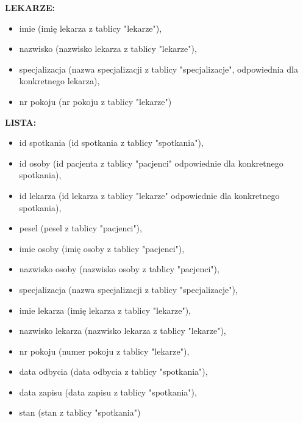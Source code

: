 \documentclass[a4paper]{article} \usepackage{polski} \usepackage[cp1250]{inputenc} \usepackage{url}
\begin{document}
\textbf{LEKARZE:}
\begin {itemize}
\item imie (imię lekarza z tablicy "lekarze"),
\item nazwisko (nazwisko lekarza z tablicy "lekarze"),
\item specjalizacja (nazwa specjalizacji z tablicy "specjalizacje", odpowiednia dla konkretnego lekarza),
\item  nr pokoju (nr pokoju z tablicy "lekarze")
\end {itemize}\newline

\textbf{LISTA:}
\begin {itemize}
\item id spotkania (id spotkania z tablicy "spotkania"),
\item id osoby (id pacjenta z tablicy "pacjenci" odpowiednie dla konkretnego spotkania),
\item id lekarza (id lekarza z tablicy "lekarze" odpowiednie dla konkretnego spotkania),
\item pesel (pesel z tablicy "pacjenci"),
\item imie osoby (imię osoby z tablicy "pacjenci"),
\item nazwisko osoby (nazwisko osoby z tablicy "pacjenci"),
\item specjalizacja (nazwa specjalizacji z tablicy "specjalizacje"),
\item imie lekarza (imię lekarza z tablicy "lekarze"),
\item nazwisko lekarza (nazwisko lekarza z tablicy "lekarze"),
\item nr pokoju (numer pokoju z tablicy "lekarze"),
\item data odbycia (data odbycia z tablicy "spotkania"),
\item data zapisu (data zapisu z tablicy "spotkania"),
\item stan (stan z tablicy "spotkania")

\end {itemize}
\end{document}
